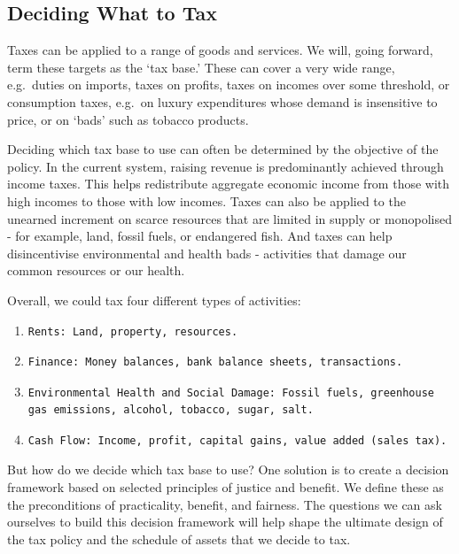 \documentclass[]{tufte-handout}
\begin{document}
\hypertarget{deciding-what-to-tax}{%
\subsection{Deciding What to Tax}\label{deciding-what-to-tax}}

Taxes can be applied to a range of goods and services. We will, going
forward, term these targets as the `tax base.' These can cover a very
wide range, e.g.~duties on imports, taxes on profits, taxes on incomes
over some threshold, or consumption taxes, e.g.~on luxury expenditures
whose demand is insensitive to price, or on `bads' such as tobacco
products.

Deciding which tax base to use can often be determined by the objective
of the policy. In the current system, raising revenue is predominantly
achieved through income taxes. This helps redistribute aggregate
economic income from those with high incomes to those with low incomes.
Taxes can also be applied to the unearned increment on scarce resources
that are limited in supply or monopolised - for example, land, fossil
fuels, or endangered fish. And taxes can help disincentivise
environmental and health bads - activities that damage our common
resources or our health.

Overall, we could tax four different types of activities:

\begin{enumerate}
\def\labelenumi{\arabic{enumi}.}
\item
\begin{verbatim}
Rents: Land, property, resources.
\end{verbatim}
\item
\begin{verbatim}
Finance: Money balances, bank balance sheets, transactions.
\end{verbatim}
\item
\begin{verbatim}
Environmental Health and Social Damage: Fossil fuels, greenhouse gas emissions, alcohol, tobacco, sugar, salt.
\end{verbatim}
\item
\begin{verbatim}
Cash Flow: Income, profit, capital gains, value added (sales tax).
\end{verbatim}
\end{enumerate}

But how do we decide which tax base to use? One solution is to create a
decision framework based on selected principles of justice and benefit.
We define these as the preconditions of practicality, benefit, and
fairness. The questions we can ask ourselves to build this decision
framework will help shape the ultimate design of the tax policy and the
schedule of assets that we decide to tax.
\end{document}
